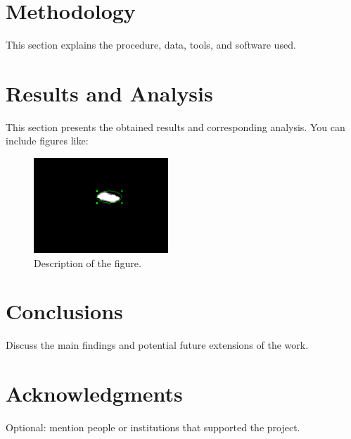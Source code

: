 \documentclass[aps,prd,nofootinbib,superscriptaddress,floatfix,longbibliography,author-year]{revtex4-2}
\begin{document}
\section{Methodology}
This section explains the procedure, data, tools, and software used.

\section{Results and Analysis}
This section presents the obtained results and corresponding analysis. You can include figures like:
\begin{figure}[h]
    \centering
    \includegraphics[width=0.45\textwidth]{Images/Ellipse_region.png}
    \caption{Description of the figure.}
    \label{fig:example}
\end{figure}

\section{Conclusions}
Discuss the main findings and potential future extensions of the work.

\section*{Acknowledgments}
Optional: mention people or institutions that supported the project.

\end{document}
